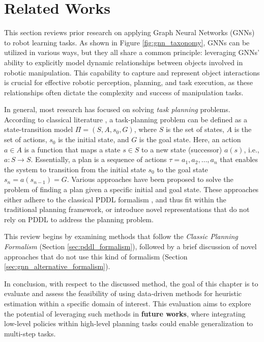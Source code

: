 \section{Related Works}
\label{sec:gnn_related_works}
This section reviews prior research on applying Graph Neural Networks (GNNs) to robot learning tasks. As shown in Figure \ref{fig:gnn_taxonomy}, GNNs can be utilized in various ways, but they all share a common principle: leveraging GNNs' ability to explicitly model dynamic relationships between objects involved in robotic manipulation. This capability to capture and represent object interactions is crucial for effective robotic perception, planning, and task execution, as these relationships often dictate the complexity and success of manipulation tasks.



In general, most research has focused on solving \textit{task planning} problems. According to classical literature \cite{geffner2013concise}, a task-planning problem can be defined as a state-transition model $\Pi = \left( S, A, s_{0}, G \right)$, where $S$ is the set of states, $A$ is the set of actions, $s_{0}$ is the initial state, and $G$ is the goal state. Here, an action $a \in A$ is a function that maps a state $s \in S$ to a new state (successor) $a(s)$, i.e., $a: S \rightarrow S$. Essentially, a plan is a sequence of actions $\tau = a_{1}, a_{2}, \dots, a_{n}$ that enables the system to transition from the initial state $s_{0}$ to the goal state $s_{n} = a(s_{n-1}) = G$. Various approaches have been proposed to solve the problem of finding a plan given a specific initial and goal state. These approaches either adhere to the classical PDDL formalism \cite{aeronautiques1998pddl}, and thus fit within the traditional planning framework, or introduce novel representations that do not rely on PDDL to address the planning problem.

This review begins by examining methods that follow the \textit{Classic Planning Formalism}  (Section \ref{sec:pddl_formalism}), followed by a brief discussion of novel approaches that do not use this kind of formalism (Section \ref{sec:gnn_alternative_formalism}).




In conclusion, with respect to the discussed method, the goal of this chapter is to evaluate and assess the feasibility of using data-driven methods for heuristic estimation within a specific domain of interest. This evaluation aims to explore the potential of leveraging such methods in \textbf{future works}, where integrating low-level policies within high-level planning tasks could enable generalization to multi-step tasks.
